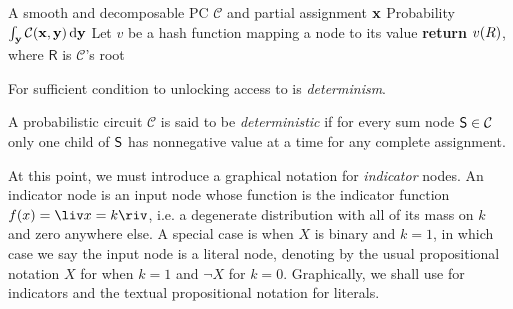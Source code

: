 \begin{algorithm}[t]
  \caption{\mar}\label{alg:mar}
  \begin{algorithmic}[1]
    \Require A smooth and decomposable PC $\mathcal{C}$ and partial assignment $\mathbf{x}$
    \Ensure Probability $\int_{\mathbf{y}}\mathcal{C}(\mathbf{x},\mathbf{y})\mathop{}\!\mathrm{d}\mathbf{y}$
    \State Let $v$ be a hash function mapping a node to its value
    \EndFor%
    \State \textbf{return} $v(\normalfont{R})$, where $\textsf{R}$ is $\mathcal{C}$'s root
  \end{algorithmic}
\end{algorithm}

For sufficient condition to unlocking access to \map{} is \emph{determinism}.

\begin{definition}[Determinism]
  A probabilistic circuit $\mathcal{C}$ is said to be \emph{deterministic} if for every sum node
  $\operatorname{\textup{\textsf{S}}}\in\mathcal{C}$ only one child of $\operatorname{\textup{\textsf{S}}}$ has nonnegative value at a time for any complete
  assignment.
\end{definition}

At this point, we must introduce a graphical notation for \emph{indicator} nodes. An indicator node
is an input node whose function is the indicator function $f(x)=\liv x=k\riv$, i.e. a degenerate
distribution with all of its mass on $k$ and zero anywhere else. A special case is when $X$ is
binary and $k=1$, in which case we say the input node is a literal node, denoting by the usual
propositional notation $X$ for when $k=1$ and $\neg X$ for $k=0$. Graphically, we shall use
\inode{\newLeafNode} for indicators and the textual propositional notation for literals.

